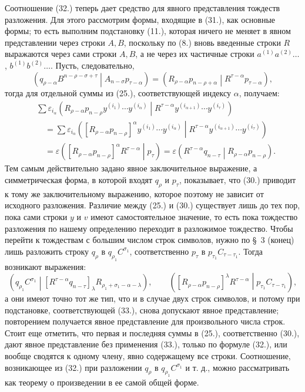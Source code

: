 \documentclass[11pt]{article}
\newcommand{\pair}[2]{\left(#1\middle|#2\right)}
\newcommand{\eps}{\varepsilon}
\begin{document}
Соотношение (32.) теперь дает средство для явного представления тождеств разложения. Для этого рассмотрим формы, входящие в (31.), как основные формы; то есть выполним подстановку (11.), которая ничего не меняет в явном представлении через строки $A,B$, поскольку по (8.) вновь введенные строки $R$ выражаются через сами строки $A,B$, а не через их частичные строки $a^{(1)}a^{(2)}\ldots$, $b^{(1)}b^{(2)}\ldots$. Пусть, следовательно,
\begin{equation}
 \pair{q_{\rho-\alpha}B^{n-\rho-\sigma+\tau}}{A_{n-\sigma}p_{\tau-\alpha}}
 =\pair{R_{\rho-\alpha}p_{n-\rho+\alpha}}{R^{\tau-\alpha}p_{\tau-\alpha}},
\tag{33}
\end{equation}
тогда для отдельной суммы из (25.), соответствующей индексу $\alpha$, получаем:
\begin{equation}
\begin{aligned}
&\sum \eps_{i_\alpha}
\pair{R_{\rho-\alpha}p_{n-\rho}y^{(i_1)}\cdots y^{(i_\alpha)}}
{R^{\tau-\alpha}y^{(i_{\alpha+1})}\cdots y^{(i_\tau)}}\\
&\quad=\sum \eps_{i_\alpha}
\pair{[R_{\rho-\alpha}p_{n-\rho}]^\alpha
y^{(i_1)}\cdots y^{(i_\alpha)}}
{R^{\tau-\alpha}y^{(i_{\alpha+1})}\cdots y^{(i_\tau)}}\\
&\quad=\eps\pair{[R_{\rho-\alpha}p_{n-\rho}]^\alpha R^{\tau-\alpha}}{p_\tau}
 =\eps\pair{R^{\tau-\alpha}q_{n-\tau}}{R_{\rho-\alpha}p_{n-\rho}}.
\end{aligned}
\tag{34}
\end{equation}
Тем самым действительно задано явное заключительное выражение, а симметрическая форма, в которой входят $q_\rho$ и $p_\tau$, показывает, что (30.) приводит к тому же заключительному выражению, которое поэтому не зависит от исходного разложения. Различие между (25.) и (30.) существует лишь до тех пор, пока сами строки $y$ и $v$ имеют самостоятельное значение, то есть пока тождество разложения по нашему определению переходит в разложимое тождество. Чтобы перейти к тождествам с большим числом строк символов, нужно по \S\ 3 (конец) лишь разложить строку $q_\rho$ в $q_{\rho_1}C^{\sigma_1}$, соответственно $p_\tau$ в $p_{\tau_1}C_{\tau-\tau_1}$. Тогда возникают выражения:
\begin{equation}
 \pair{q_{\rho_1}C^{\sigma_1}}
 {[R^{\tau-\alpha}q_{n-\tau}]_\lambda R_{\rho_1+\sigma_1-\alpha-\lambda}},
 \qquad
 \pair{[R_{\rho-\alpha}p_{n-\rho}]^\lambda R^{\tau-\alpha}}
 {p_{\tau_1}C_{\tau-\tau_1}},
\tag{35}
\end{equation}
а они имеют точно тот же тип, что и в случае двух строк символов, и потому при подстановке, соответствующей (33.), снова допускают явное представление; повторением получается явное представление для произвольного числа строк. Стоит еще отметить, что первая и последняя суммы в (25.), соответственно (30.), дают явное представление без применения (33.), только по формуле (32.), или вообще сводятся к одному члену, явно содержащему все строки. Соотношение, возникающее из (32.) при разложении $q_\rho$ в $q_{\rho_1}C^{\sigma_1}$ и т. д., можно рассматривать как теорему о произведении в ее самой общей форме.
\end{document}
